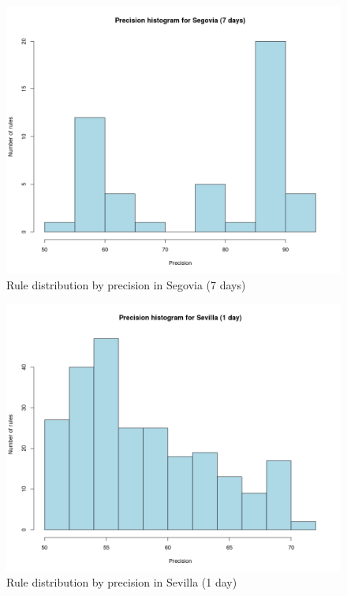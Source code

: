 \begin{figure}[hbtp]
\includegraphics[width=\textwidth]{img/hist_seg7.png}
\caption{Rule distribution by precision in Segovia (7 days)} \label{fig:hist_seg7}
\end{figure}

\begin{figure}[hbtp]
\includegraphics[width=\textwidth]{img/hist_sev1.png}
\caption{Rule distribution by precision in Sevilla (1 day)} \label{fig:hist_sev1}
\end{figure}

